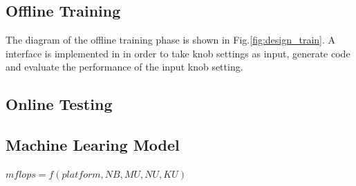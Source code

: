   \subsection{Offline Training}
  \label{sec:offline_training}
  The diagram of the offline training phase is shown in
  Fig.\ref{fig:design_train}. A interface is implemented in \atl in order to
  take knob settings as input, generate code and evaluate the performance of
  the input knob setting. 

  \subsection{Online Testing}
  \label{sec:online_training}

  \subsection{Machine Learing Model}
  \label{sec:maching_learning_model}



$mflops = f(platform, NB, MU, NU, KU)$

